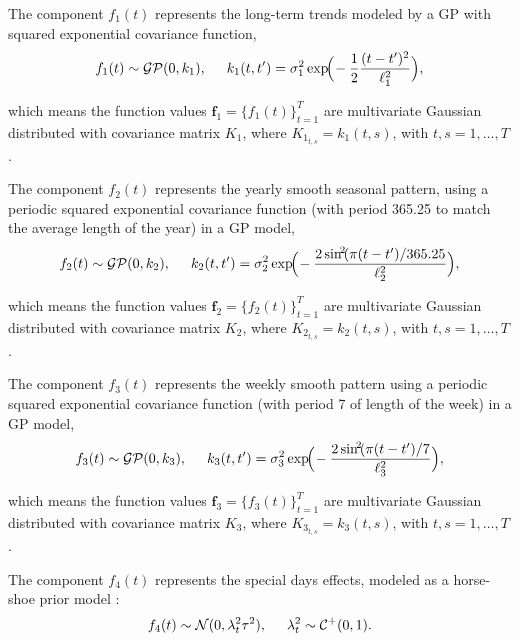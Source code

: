 \documentclass[onecolumn,a4paper,11pt]{article}
\begin{document}
The component $f_1(t)$ represents the long-term trends modeled by a GP with squared exponential covariance function,
%
\begin{equation*}
f_1(t) \sim \mathcal{GP}(0,k_1), \hspace{5mm} k_1(t,t') = \sigma_1^2 \exp\!\!\Big(\!-\frac{1}{2} \frac{(t-t')^2}{\ell_1^2}\Big), 
\end{equation*}

\noindent which means the function values $\bm{f}_1=\{f_1(t)\}_{t=1}^T$ are multivariate Gaussian distributed with covariance matrix $K_1$, where $K_{1_{t,s}}=k_1(t,s)$, with $t,s=1,\dots,T$.

The component $f_2(t)$ represents the yearly smooth seasonal pattern, using a periodic squared exponential covariance function (with period 365.25 to match the average length of the year) in a GP model,
%
\begin{equation*}
f_2(t) \sim \mathcal{GP}(0,k_2), \hspace{5mm} k_2(t,t') = \sigma_2^2 \exp\!\!\Big(\!-\frac{2\,\text{sin}^{\!2}\!(\pi(t-t')/365.25}{\ell_2^2}\Big), 
\end{equation*}

\noindent which means the function values $\bm{f}_2=\{f_2(t)\}_{t=1}^T$ are multivariate Gaussian distributed with covariance matrix $K_2$, where $K_{2_{t,s}}=k_2(t,s)$, with $t,s=1,\dots,T$.

The component $f_3(t)$ represents the weekly smooth pattern using a periodic squared exponential covariance function (with period 7 of length of the week) in a GP model,
%
\begin{equation*}
f_3(t) \sim \mathcal{GP}(0,k_3), \hspace{5mm} k_3(t,t') = \sigma_3^2 \exp\!\!\Big(\!-\frac{2\,\text{sin}^{\!2}\!(\pi(t-t')/7}{\ell_3^2}\Big), 
\end{equation*}

\noindent which means the function values $\bm{f}_3=\{f_3(t)\}_{t=1}^T$ are multivariate Gaussian distributed with covariance matrix $K_3$, where $K_{3_{t,s}}=k_3(t,s)$, with $t,s=1,\dots,T$.

The component $f_4(t)$ represents the special days effects, modeled as a horse-shoe prior model \citep{piironen2017sparsity}:
%
\begin{equation*}
f_4(t) \sim \mathcal{N}(0,\lambda^2_t \tau^2), \hspace{5mm} \lambda^2_t \sim \mathcal{C}^{+}(0,1).
\end{equation*}
\end{document}
